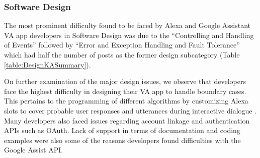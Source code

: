 \documentclass{sigchi}
\begin{document}
\subsubsection{Software Design}
The most prominent difficulty found to be faced by Alexa and Google Assistant VA app developers in Software Design was due to the ``Controlling and Handling of Events'' followed by ``Error and Exception Handling and Fault Tolerance'' which had half the number of posts as the former design subcategory (Table \ref{table:DesignKASummary}). 

On further examination of the major design issues, we observe that developers face the highest difficulty in designing their VA app to handle boundary cases. This pertains to the programming of different algorithms by customizing Alexa slots to cover probable user responses and utterances during interactive dialogue  . Many developers also faced issues regarding account linkage and authentication APIs such as OAuth. Lack of support in terms of documentation and coding examples were also some of the reasons developers found difficulties with the Google Assist API.  
\end{document}
